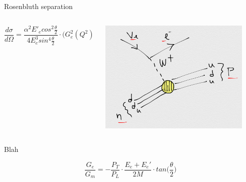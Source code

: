 \begin{frame}{Rosenbluth separation}

\begin{columns}
  \begin{column}{0.50\textwidth}

    \begin{equation*}
      \frac{d\sigma}{d\Omega} =
        \frac { \alpha^2 E'_{e} cos^{2}\frac{\theta}{2} }
              { 4 E_{e}^{3} sin^{4}\frac{\theta}{2} }
        \cdot
        \Big(
          G_{e}^{2}(Q^2) + \frac{\tau}{\epsilon} G_{e}^{2}(Q^2)
        \Big)
        \cdot
        \Big(
          \frac{1}{1+\tau}
        \Big)
    \end{equation*}

  \end{column}
  \begin{column}{0.50\textwidth}
   \begin{center}
    \includegraphics[width=0.90\textwidth]{./images/nuint/feyn/ccqe_feynman_diagram_0.png}\\
   \end{center}
  \end{column}
\end{columns}

\end{frame}

%
%
%

\begin{frame}{Blah}

\begin{equation*}
  \frac{G_{e}}{G_{m}} =
      - \frac{P_{T}}{P_{L}}
      \cdot
      \frac{E_{e}+E_{e}'}{2M}
      \cdot
      tan\Big( \frac{\theta}{2} \Big)
\end{equation*}

\end{frame}

